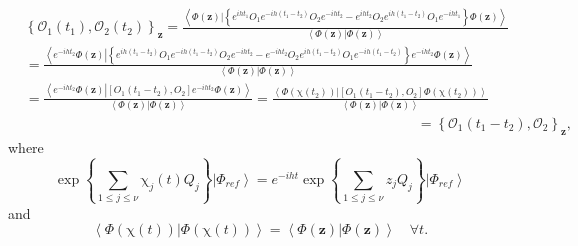 \documentclass[aps,preprint]{revtex4}%
\begin{document}
\begin{align}
&  \left\{  \mathcal{O}_{1}\left(  t_{1}\right)  ,\mathcal{O}_{2}\left(
t_{2}\right)  \right\}  _{\mathbf{z}}=\frac{\left\langle \left.  \Phi\left(
\mathbf{z}\right)  \right\vert \left\{  e^{iht_{1}}O_{1}e^{-ih\left(
t_{1}-t_{2}\right)  }O_{2}e^{-iht_{2}}-e^{iht_{2}}O_{2}e^{ih\left(
t_{1}-t_{2}\right)  }O_{1}e^{-iht_{1}}\right\}  \Phi\left(  \mathbf{z}\right)
\right\rangle }{\left\langle \left.  \Phi\left(  \mathbf{z}\right)
\right\vert \Phi\left(  \mathbf{z}\right)  \right\rangle }\nonumber\\
&  =\frac{\left\langle \left.  e^{-iht_{2}}\Phi\left(  \mathbf{z}\right)
\right\vert \left\{  e^{ih\left(  t_{1}-t_{2}\right)  }O_{1}e^{-ih\left(
t_{1}-t_{2}\right)  }O_{2}e^{-iht_{2}}-e^{-iht_{2}}O_{2}e^{ih\left(
t_{1}-t_{2}\right)  }O_{1}e^{-ih\left(  t_{1}-t_{2}\right)  }\right\}
e^{-iht_{2}}\Phi\left(  \mathbf{z}\right)  \right\rangle }{\left\langle
\left.  \Phi\left(  \mathbf{z}\right)  \right\vert \Phi\left(  \mathbf{z}%
\right)  \right\rangle }\nonumber\\
&  =\frac{\left\langle \left.  e^{-iht_{2}}\Phi\left(  \mathbf{z}\right)
\right\vert \left[  O_{1}\left(  t_{1}-t_{2}\right)  ,O_{2}\right]
e^{-iht_{2}}\Phi\left(  \mathbf{z}\right)  \right\rangle }{\left\langle
\left.  \Phi\left(  \mathbf{z}\right)  \right\vert \Phi\left(  \mathbf{z}%
\right)  \right\rangle }=\frac{\left\langle \left.  \Phi\left(  \mathrm{\chi
}\left(  t_{2}\right)  \right)  \right\vert \left[  O_{1}\left(  t_{1}%
-t_{2}\right)  ,O_{2}\right]  \Phi\left(  \mathrm{\chi}\left(  t_{2}\right)
\right)  \right\rangle }{\left\langle \left.  \Phi\left(  \mathbf{z}\right)
\right\vert \Phi\left(  \mathbf{z}\right)  \right\rangle }\nonumber\\
&  \left.  \qquad\qquad\qquad\qquad\qquad\qquad\qquad\qquad\qquad\qquad
\qquad\qquad\qquad\qquad\right.  =\left\{  \mathcal{O}_{1}\left(  t_{1}%
-t_{2}\right)  ,\mathcal{O}_{2}\right\}  _{\mathbf{z}},
\end{align}
where
\begin{equation}
\exp\left\{  \sum_{1\leq j\leq\nu}\mathrm{\chi}_{j}\left(  t\right)
Q_{j}\right\}  \left\vert \Phi_{ref}\right\rangle =e^{-iht}\exp\left\{
\sum_{1\leq j\leq\nu}z_{j}Q_{j}\right\}  \left\vert \Phi_{ref}\right\rangle
\end{equation}
and
\begin{equation}
\left\langle \left.  \Phi\left(  \mathrm{\chi}\left(  t\right)  \right)
\right\vert \Phi\left(  \mathrm{\chi}\left(  t\right)  \right)  \right\rangle
=\left\langle \left.  \Phi\left(  \mathbf{z}\right)  \right\vert \Phi\left(
\mathbf{z}\right)  \right\rangle \quad\forall t.
\end{equation}




\end{document}
